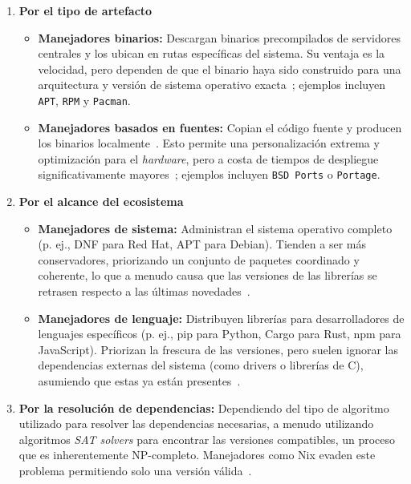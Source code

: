 \begin{enumerate}
\item \textbf{Por el tipo de artefacto}

\begin{itemize}
\item \textbf{Manejadores binarios:} Descargan binarios precompilados de servidores centrales y los ubican en rutas específicas del sistema. Su ventaja es la velocidad, pero dependen de que el binario haya sido construido para una arquitectura y versión de sistema operativo exacta~\cite{Zwinger2026}; ejemplos incluyen \texttt{APT}, \texttt{RPM} y \texttt{Pacman}.
\item \textbf{Manejadores basados en fuentes:} Copian el código fuente y producen los binarios localmente~\cite{Zwinger2026}. Esto permite una personalización extrema y optimización para el \emph{hardware}, pero a costa de tiempos de despliegue significativamente mayores~\cite{Dolstra2006}; ejemplos incluyen \texttt{BSD Ports} o \texttt{Portage}.
\end{itemize}
\item \textbf{Por el alcance del ecosistema}

\begin{itemize}
\item \textbf{Manejadores de sistema:} Administran el sistema operativo completo (p. ej., DNF para Red Hat, APT para Debian). Tienden a ser más conservadores, priorizando un conjunto de paquetes coordinado y coherente, lo que a menudo causa que las versiones de las librerías se retrasen respecto a las últimas novedades~\cite{Gibb2026}.
\item \textbf{Manejadores de lenguaje:} Distribuyen librerías para desarrolladores de lenguajes específicos (p. ej., pip para Python, Cargo para Rust, npm para JavaScript). Priorizan la frescura de las versiones, pero suelen ignorar las dependencias externas del sistema (como drivers o librerías de C), asumiendo que estas ya están presentes~\cite{Gibb2026}.
\end{itemize}
\item \textbf{Por la resolución de dependencias:} Dependiendo del tipo de algoritmo utilizado para resolver las dependencias necesarias, a menudo utilizando algoritmos \emph{SAT solvers} para encontrar las versiones compatibles, un proceso que es inherentemente NP-completo. Manejadores como Nix evaden este problema permitiendo solo una versión válida~\cite{Dolstra2006}.
\end{enumerate}


